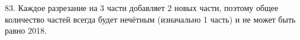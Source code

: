 83. Каждое разрезание на 3 части добавляет 2 новых части, поэтому общее количество частей всегда будет нечётным (изначально 1 часть) и не может быть равно 2018.\\

